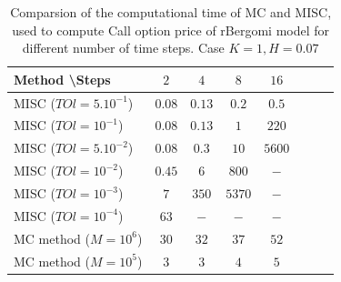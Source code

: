 \documentclass[11pt]{article}
\begin{document}
\begin{table}[h!]
	\centering
	\begin{tabular}{l*{6}{c}r}
		Method \textbackslash  Steps            & $2$ & $4$ & $8$ & $16$ &   \\
		\hline
			MISC ($TOl=5.10^{-1}$)  & $0.08$ & $0.13$ & $0.2$ & $0.5$  \\
		MISC ($TOl=10^{-1}$)  & $0.08$ & $0.13$ & $1$ & $220$  \\
		MISC ($TOl=5.10^{-2}$)  & $0.08$ & $0.3$ & $10$ & $5600$  \\
		MISC ($TOl=10^{-2}$)  & $0.45$ & $6$ & $800$ & $-$  \\
		MISC ($TOl=10^{-3}$)  & $7$ & $350$ & $5370$ & $-$  \\		
			MISC ($TOl=10^{-4}$)  & $63$ & $-$ & $-$ & $-$  \\	
\hline
		MC method ($M=10^6$)   & $30$  & $32$  & $37$ & $52$  \\
		MC method ($M=10^5$)   & $3$  & $3$  & $4$ & $5$  \\	
		\hline
	\end{tabular}
	\caption{Comparsion of the computational time of  MC and MISC, used to compute Call option price of rBergomi model for different number of time steps. Case $K=1, H=0.07$}
	\label{Comparsion of the computational time of  MC and MISC, used to compute Call option price of rBergomi model for different number of time steps. Case $K=1, H=0.07$}
\end{table}
\end{document}
